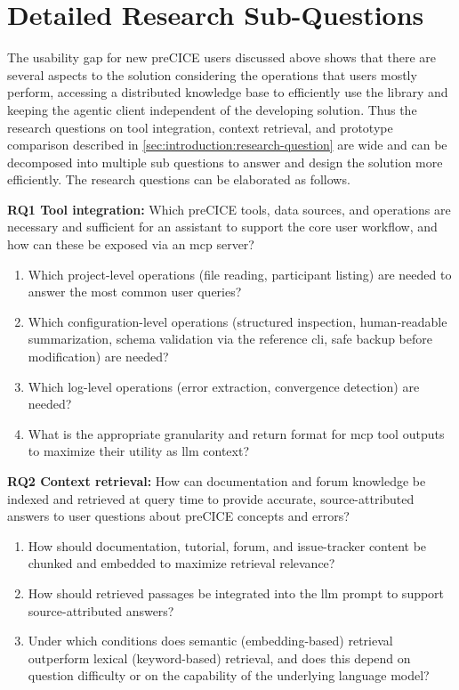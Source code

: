 \documentclass[
  numbers=noenddot,
  english,
  a4paper,
  twoside,
  bibliography=totoc,
  headsepline,
  cleardoublepage=empty,
  parskip=half,
  draft=false
]{scrbook}
\theoremstyle{break}
\renewcommand{\_}{\textunderscore\allowbreak}
\begin{document}
\section{Detailed Research Sub-Questions}\label{sec:problem-exposition:research-problems}

The usability gap for new preCICE users discussed above shows that there are several aspects to the solution 
considering the operations that users mostly perform, accessing a distributed knowledge base to 
efficiently use the library and keeping the agentic client independent of the developing solution.
Thus the research questions on tool integration, 
context retrieval, and prototype comparison described in \cref{sec:introduction:research-question} 
are wide and can be decomposed into multiple sub questions to answer and design the solution more efficiently.
The research questions can be elaborated as follows.

\textbf{RQ1 Tool integration:} Which preCICE tools, data sources, and operations are necessary and
sufficient for an assistant to support the core user workflow, and how can these be exposed via an
\gls{mcp} server?
\begin{enumerate}[label=RQ1.\arabic*]
  \item Which project-level operations (file reading, participant listing) are
        needed to answer the most common user queries?
  \item Which configuration-level operations (structured inspection, human-readable
        summarization, schema validation via the reference \gls{cli}, safe backup before
        modification) are needed?
  \item Which log-level operations (error extraction, convergence detection) are needed?
  \item What is the appropriate granularity and return format for \gls{mcp} tool outputs to
        maximize their utility as \gls{llm} context?
\end{enumerate}

\textbf{RQ2 Context retrieval:} How can documentation and forum knowledge be indexed and retrieved at
query time to provide accurate, source-attributed answers to user questions about preCICE concepts
and errors?
\begin{enumerate}[label=RQ2.\arabic*]
  \item How should documentation, tutorial, forum, and issue-tracker content be chunked and
        embedded to maximize retrieval relevance?
  \item How should retrieved passages be integrated into the \gls{llm} prompt to support
        source-attributed answers?
  \item Under which conditions does semantic (embedding-based) retrieval outperform lexical
        (keyword-based) retrieval, and does this depend on question difficulty or on the
        capability of the underlying language model?
\end{enumerate}
\end{document}
